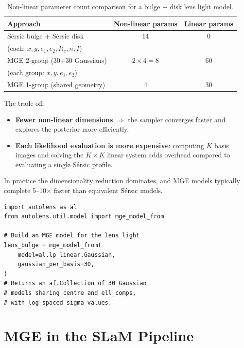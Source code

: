 \documentclass[11pt, letterpaper]{article}
\begin{document}
\begin{table}[h]
\centering
\caption{Non-linear parameter count comparison for a bulge + disk
lens light model.}
\label{tab:param-count}
\begin{tabular}{lcc}
\toprule
\textbf{Approach} & \textbf{Non-linear params} & \textbf{Linear params} \\
\midrule
S\'ersic bulge + S\'ersic disk & 14 & 0 \\
\quad (each: $x, y, e_1, e_2, R_e, n, I$) & & \\
\addlinespace
MGE 2-group (30+30 Gaussians) & $2 \times 4 = 8$ & 60 \\
\quad (each group: $x, y, e_1, e_2$) & & \\
\addlinespace
MGE 1-group (shared geometry) & 4 & 30 \\
\bottomrule
\end{tabular}
\end{table}

\noindent The trade-off:
\begin{itemize}[nosep]
  \item \textbf{Fewer non-linear dimensions} $\Rightarrow$ the sampler
    converges faster and explores the posterior more efficiently.
  \item \textbf{Each likelihood evaluation is more expensive}: computing
    $K$ basis images and solving the $K \times K$ linear system adds
    overhead compared to evaluating a single S\'ersic profile.
\end{itemize}
In practice the dimensionality reduction dominates, and MGE models
typically complete 5--10$\times$ faster than equivalent S\'ersic models.

\begin{pythonbox}[title={The \texttt{mge\_model\_from} Utility}]
\begin{lstlisting}
import autolens as al
from autolens.util.model import mge_model_from

# Build an MGE model for the lens light
lens_bulge = mge_model_from(
    model=al.lp_linear.Gaussian,
    gaussian_per_basis=30,
)
# Returns an af.Collection of 30 Gaussian
# models sharing centre and ell_comps,
# with log-spaced sigma values.
\end{lstlisting}
\end{pythonbox}

\section{MGE in the SLaM Pipeline}
\label{sec:slam}
\end{document}
